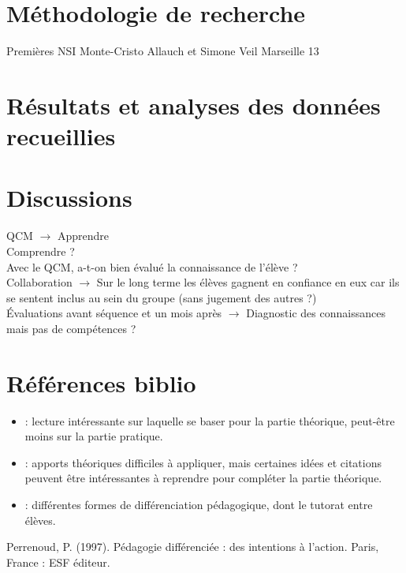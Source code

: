 \documentclass[a4paper]{article}
\begin{document}
\section{Méthodologie de recherche}
Premières NSI Monte-Cristo Allauch et Simone Veil Marseille 13\newpage

\section{Résultats et analyses des données recueillies}
\newpage

\section{Discussions}
QCM $\rightarrow$ Apprendre\\
Comprendre ?\\
Avec le QCM, a-t-on bien évalué la connaissance de l'élève ?\\


Collaboration $\rightarrow$ Sur le long terme les élèves gagnent en confiance en eux car ils se sentent inclus au sein du groupe (sans jugement des autres ?)\\


Évaluations avant séquence et un mois après $\rightarrow$ Diagnostic des connaissances mais pas de compétences ?\\\newpage


\section*{Références biblio}
\begin{itemize}
	\item \cite{Lautru} : lecture intéressante sur laquelle se baser pour la partie théorique, peut-être moins sur la partie pratique.
	\item \cite{Meirieu} : apports théoriques difficiles à appliquer, mais certaines idées et citations peuvent être intéressantes à reprendre pour compléter la partie théorique.
	\item \cite{Forget} : différentes formes de différenciation pédagogique, dont le tutorat entre élèves.
\end{itemize}

\begin{thebibliography}{4}
 Perrenoud, P. (1997). Pédagogie différenciée : des intentions à l’action. Paris, France : ESF éditeur.
\end{thebibliography}
\end{document}
